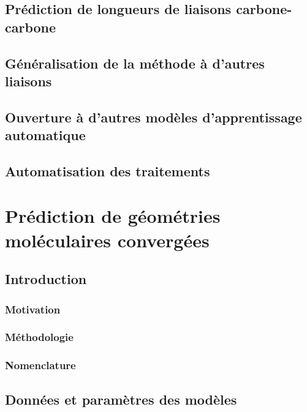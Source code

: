 \documentclass{report}
\begin{document}
	\section{Prédiction de longueurs de liaisons carbone-carbone}
		
	\section{Généralisation de la méthode à d'autres liaisons}
		
	\section{Ouverture à d'autres modèles d'apprentissage automatique}
		
	\section{Automatisation des traitements}
		
		


\chapter{Prédiction de géométries moléculaires convergées}

	\section{Introduction}
		\subsection{Motivation}
			
		\subsection{Méthodologie}
			
		\subsection{Nomenclature}
			
			
	\section{Données et paramètres des modèles}
\end{document}
